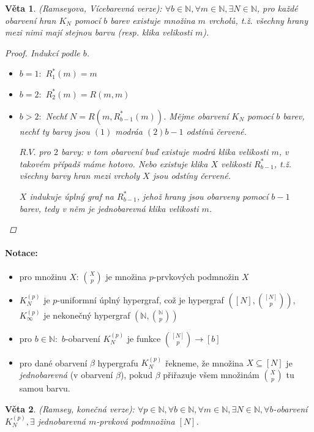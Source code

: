 \documentclass[10pt,a4paper]{article}
\newtheorem{veta}{Věta}
\newcommand{\N}{{\mathbb{N}}}       %
\begin{document}
\begin{veta} (Ramseyova, Vícebarevná verze): \normalfont
    $\forall b \in \N, \forall m \in \N, \exists N \in \N$, pro každé obarvení hran $K_N$ pomocí $b$ barev existuje množina $m$ vrcholů, t.ž.
    všechny hrany mezi nimi mají stejnou barvu (resp. klika velikosti $m$).
    \begin{proof}
        Indukcí podle $b$. 
        \begin{itemize}
            \item $b=1:$ $R^*_1(m)=m$
            \item $b=2:$ $R^*_2(m) = R(m,m)$
            \item $b>2:$ Nechť $N = R(m, R^*_{b-1}(m))$. Mějme obarvení $K_N$ pomocí $b$ barev, nechť ty barvy jsou $(1)$ modráa $(2) b-1$ odstínů červené.
            
            $R.V.$ pro $2$ barvy: v tom obarvení buď existuje modrá klika velikosti $m$, v takovém případš máme hotovo.
            Nebo existuje klika $X$ velikosti $R^*_{b-1}$, t.ž. všechny barvy hran mezi vrcholy $X$ jsou odstíny červené.

            $X$ indukuje úplný graf na $R^*_{b-1}$, jehož hrany jsou obarveny pomocí $b-1$ barev, tedy v něm je jednobarevná klika velikosti $m$.
        \end{itemize}
    \end{proof}
\end{veta}

\paragraph*{Notace:} \normalfont
\begin{itemize}
    \item pro množinu $X$: $\binom Xp$ je množina $p$-prvkových podmnožin $X$
    \item $K_N^{(p)}$ je $p$-uniformní úplný hypergraf, což je hypergraf $([N], \binom{[N]}{p})$, $K_{\infty}^{(p)}$ je nekonečný hypergraf $(\N, \binom{\N}p)$
    \item pro $b\in \N:$ $b$-obarvení $K_N^{(p)}$ je funkce $\binom{[N]}{p} \to [b]$
    \item pro dané obarvení $\beta$ hypergrafu $K_N^{(p)}$ řekneme, že množina $X\subseteq [N]$ je \textit{jednobarevná} (v obarvení $\beta$), pokud $\beta$ přiřazuje všem množinám $\binom Xp$ tu samou barvu.
\end{itemize}

\begin{veta} (Ramsey, konečná verze): \normalfont
    $\forall p \in \N, \forall b \in \N, \forall m\in \N, \exists N \in \N, \forall b$-obarvení $K_N^{(p)}, \exists $ jednobarevná $m$-prvková podmnožina $[N]$.
\end{veta}
\end{document}
